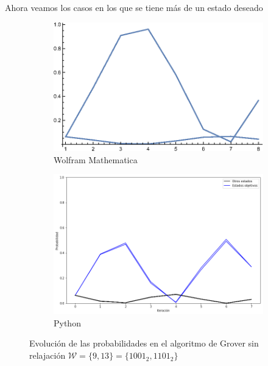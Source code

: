Ahora veamos los casos en los que se tiene más de un estado deseado

\begin{figure}[H]
    \centering
    \begin{subfigure}[m]{0.49\textwidth}
        \centering
        \includegraphics[width=0.9\linewidth]{img/Grover-2_gr1.eps}
        \caption{Wolfram Mathematica}
    \end{subfigure}
    \begin{subfigure}[m]{0.49\textwidth}
        \centering
        \includegraphics[width=0.9\linewidth]{img/grover2lossless.png}
        \caption{Python}
    \end{subfigure}
    \caption[Evolución de las probabilidades en el algoritmo de Grover sin relajación $\mathcal{W} = \{9, 13\}$]{Evolución de las probabilidades en el algoritmo de Grover sin relajación $\mathcal{W} = \{9, 13\} = \{1001_2, 1101_2\}$}
    \label{fig:groverlosslesscomp2}
\end{figure}

